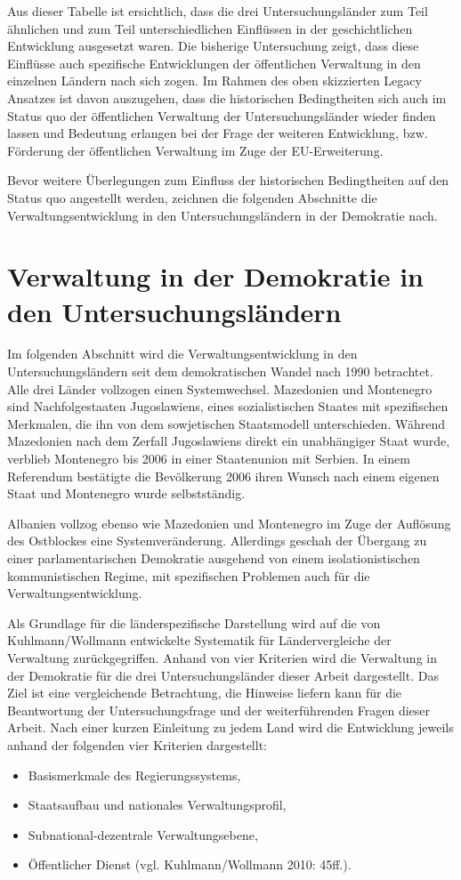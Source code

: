 Aus dieser Tabelle ist ersichtlich, dass die drei Untersuchungsländer zum Teil ähnlichen und zum Teil unterschiedlichen Einflüssen in der geschichtlichen Entwicklung ausgesetzt waren. Die bisherige Untersuchung zeigt, dass diese Einflüsse auch spezifische Entwicklungen der öffentlichen Verwaltung in den einzelnen Ländern nach sich zogen. Im Rahmen des oben skizzierten Legacy Ansatzes ist davon auszugehen, dass die historischen Bedingtheiten sich auch im Status quo der öffentlichen Verwaltung der Untersuchungsländer wieder finden lassen und Bedeutung erlangen bei der Frage der weiteren Entwicklung, bzw. Förderung der öffentlichen Verwaltung im Zuge der EU-Erweiterung.\par
Bevor weitere Überlegungen zum Einfluss der historischen Bedingtheiten auf den Status quo angestellt werden, zeichnen die folgenden Abschnitte die Verwaltungsentwicklung in den Untersuchungsländern in der Demokratie nach. 

\section{Verwaltung in der Demokratie in den Untersuchungsländern}
Im folgenden Abschnitt wird die Verwaltungsentwicklung in den Untersuchungsländern seit dem demokratischen Wandel nach 1990 betrachtet. Alle drei Länder vollzogen einen Systemwechsel. Mazedonien und Montenegro sind Nachfolgestaaten Jugoslawiens, eines sozialistischen Staates mit spezifischen Merkmalen, die ihn von dem sowjetischen Staatsmodell unterschieden. Während Mazedonien nach dem Zerfall Jugoslawiens direkt ein unabhängiger Staat wurde, verblieb Montenegro bis 2006 in einer Staatenunion mit Serbien. In einem Referendum bestätigte die Bevölkerung 2006 ihren Wunsch nach einem eigenen Staat und Montenegro wurde selbstständig.\par
Albanien vollzog ebenso wie Mazedonien und Montenegro im Zuge der Auflösung des Ostblockes eine Systemveränderung. Allerdings geschah der Übergang zu einer parlamentarischen Demokratie ausgehend von einem isolationistischen kommunistischen Regime, mit spezifischen Problemen auch für die Verwaltungsentwicklung.\par
Als Grundlage für die länderspezifische Darstellung wird auf die von Kuhlmann/Wollmann entwickelte Systematik für Ländervergleiche der Verwaltung zurückgegriffen. Anhand von vier Kriterien wird die Verwaltung in der Demokratie für die drei Untersuchungsländer dieser Arbeit dargestellt. Das Ziel ist eine vergleichende Betrachtung, die Hinweise liefern kann für die Beantwortung der Untersuchungsfrage und der weiterführenden Fragen dieser Arbeit. Nach einer kurzen Einleitung zu jedem Land wird die Entwicklung jeweils anhand der folgenden vier Kriterien dargestellt:
\begin{itemize}
\item Basismerkmale des Regierungssystems,
\item Staatsaufbau und nationales Verwaltungsprofil,
\item Subnational-dezentrale Verwaltungsebene,
\item Öffentlicher Dienst (vgl. Kuhlmann/Wollmann 2010: 45ff.).
\end{itemize}
